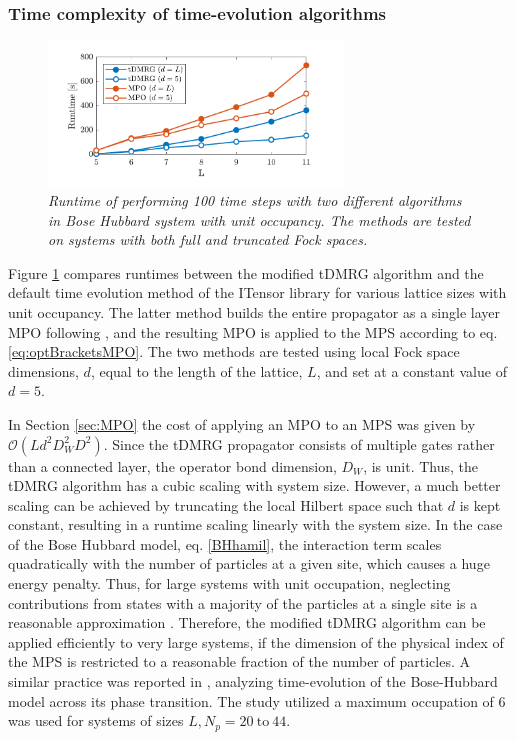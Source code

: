 \subsubsection{Time complexity of time-evolution algorithms}
\begin{figure}[h!]
    \centering
    \includegraphics[width=0.7\textwidth]{Figures/CompareRuntime.pdf}
    \caption{\textit{Runtime of performing 100 time steps with two different algorithms in Bose Hubbard system with unit occupancy. The methods are tested on systems with both full and truncated Fock spaces.}}
    \label{fig:CompareRuntime}
\end{figure}
Figure \ref{fig:CompareRuntime} compares runtimes between the modified tDMRG algorithm and the default time evolution method of the ITensor library \cite{ITensor} for various lattice sizes with unit occupancy. The latter method builds the entire propagator as a single layer MPO following \cite{Pollmann2015}, and the resulting MPO is applied to the MPS according to eq. \eqref{eq:optBracketsMPO}. The two methods are tested using local Fock space dimensions, $d$, equal to the length of the lattice, $L$, and set at a constant value of $d = 5$.

In Section \ref{sec:MPO} the cost of applying an MPO to an MPS was given by $\mathcal{O}(L d^2 D_W ^2 D^2)$. Since the tDMRG propagator consists of multiple gates rather than a connected layer, the operator bond dimension, $D_W$, is unit. Thus, the tDMRG algorithm has a cubic scaling with system size. However, a much better scaling can be achieved by truncating the local Hilbert space such that $d$ is kept constant, resulting in a runtime scaling linearly with the system size.
In the case of the Bose Hubbard model, eq. \eqref{BHhamil}, the interaction term scales quadratically with the number of particles at a given site, which causes a huge energy penalty. Thus, for large systems with unit occupation, neglecting contributions from states with a majority of the particles at a single site is a reasonable approximation \cite{Daley2004}.
Therefore, the modified tDMRG algorithm can be applied efficiently to very large systems, if the dimension of the physical index of the MPS is restricted to a reasonable fraction of the number of particles. A similar practice was reported in \cite{Braun2015}, analyzing time-evolution of the Bose-Hubbard model across its phase transition. The study utilized a maximum occupation of 6 was used for systems of sizes $L,N_p = 20 \: \text{to} \: 44$.   